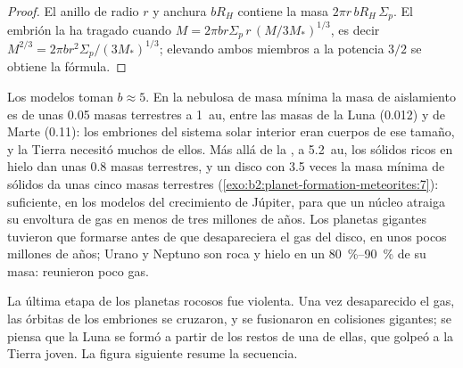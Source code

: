 \begin{proof}
El anillo de radio $r$ y anchura $bR_H$ contiene la masa
$2\pi r\, bR_H\,\Sigma_p$. El embrión la ha tragado cuando
$M = 2\pi b r\Sigma_p\, r\,(M/3M_*)^{1/3}$, es decir
$M^{2/3} = 2\pi b r^2\Sigma_p/(3M_*)^{1/3}$; elevando ambos miembros a la potencia
$3/2$ se obtiene la fórmula.
\end{proof}

Los modelos toman $b \approx 5$. En la nebulosa de masa mínima la masa de aislamiento es de
unas \num{0.05} masas terrestres a \qty{1}{au}, entre las masas de la
Luna (\num{0.012}) y de Marte (\num{0.11}): los embriones del sistema solar interior
eran cuerpos de ese tamaño, y la Tierra necesitó muchos de ellos. Más allá de la , a \qty{5.2}{au}, los sólidos ricos en hielo dan unas
\num{0.8} masas terrestres, y un disco con \num{3.5} veces la masa mínima de
sólidos da unas cinco masas terrestres (\cref{exo:b2:planet-formation-meteorites:7}): suficiente, en los modelos del crecimiento
de Júpiter, para que un núcleo atraiga su envoltura de gas en menos de tres millones de años. Los
planetas gigantes tuvieron que formarse antes de que desapareciera el gas del disco, en unos pocos
millones de años; Urano y Neptuno son roca y hielo en un \qtyrange{80}{90}{\percent}
de su masa: reunieron poco gas.

La última etapa de los planetas rocosos fue violenta. Una vez desaparecido el gas, las
órbitas de los embriones se cruzaron, y se fusionaron en colisiones gigantes; se piensa
que la Luna se formó a partir de los restos de una de ellas, que golpeó a la Tierra
joven. La figura siguiente resume la secuencia.

